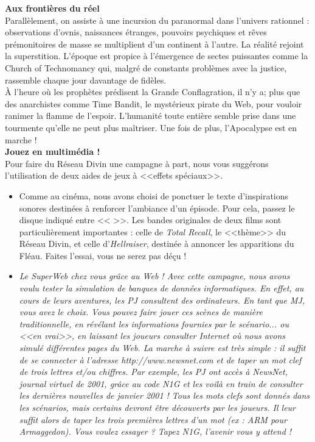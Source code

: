 \documentclass[11pt,twoside,a4paper]{book}
\begin{document}
\textbf{\large Aux fronti{\`e}res du r{\'e}el} ~\\

Parall{\`e}lement, on assiste {\`a} une incursion du paranormal dans l'univers rationnel : observations d'ovnis, naissances {\'e}tranges, pouvoirs psychiques et r{\^e}ves pr{\'e}monitoires de masse se multiplient d'un continent {\`a} l'autre. La r{\'e}alit{\'e} rejoint la superstition. L'{\'e}poque est propice {\`a} l'{\'e}mergence de sectes puissantes comme la Church of Technomancy qui, malgr{\'e} de constants probl{\`e}mes avec la justice, rassemble chaque jour davantage de fid{\`e}les. ~\\

{\`A} l'heure o{\`u} les proph{\`e}tes pr{\'e}disent la Grande Conflagration, il n'y a; plus que des anarchistes comme Time Bandit, le myst{\'e}rieux pirate du Web, pour vouloir ranimer la flamme de l'espoir. L'humanit{\'e} toute enti{\`e}re semble prise dans une tourmente qu'elle ne peut plus ma{\^i}triser. Une fois de plus, l'Apocalypse est en marche ! ~\\

\textbf{\LARGE Jouez en multim{\'e}dia !} ~\\

Pour faire du R{\'e}seau Divin une campagne {\`a} part, nous vous sugg{\'e}rons l'utilisation de deux aides de jeux {\`a} <<effets sp{\'e}ciaux>>.
\begin{itemize}
	\item Comme au cin{\'e}ma, nous avons choisi de ponctuer le texte d'inspirations sonores destin{\'e}es {\`a} renforcer l'ambiance d'un {\'e}pisode. Pour cela, passez le disque indiqu{\'e} entre << >>. Les bandes originales de deux films sont particuli{\`e}rement importantes : celle de \emph{Total Recall}, le <<th{\`e}me>> du R{\'e}seau Divin, et celle d'\emph{Hellraiser}, destin{\'e}e {\`a} annoncer les apparitions du Fl{\'e}au. Faites l'essai, vous ne serez pas d{\'e}\c{c}u ! %
	\item \emph{Le SuperWeb chez vous gr{\^a}ce au Web ! Avec cette campagne, nous avons voulu tester la simulation de banques de donn{\'e}es informatiques. En effet, au cours de leurs aventures, les PJ consultent des ordinateurs. En tant que MJ, vous avez le choix. Vous pouvez faire jouer ces sc{\`e}nes de mani{\`e}re traditionnelle, en r{\'e}v{\'e}lant les informations fournies par le sc{\'e}nario... ou <<en vrai>>, en laissant les joueurs consulter Internet o{\`u} nous avons simul{\'e} diff{\'e}rentes pages du Web. La marche {\`a} suivre est tr{\`e}s simple : il suffit de se connecter {\`a} l'adresse http://www.newsnet.com et de taper un mot clef de trois lettres et/ou chiffres. Par exemple, les PJ ont acc{\`e}s {\`a} NewsNet, journal virtuel de 2001, gr{\^a}ce au code N1G et les voil{\`a} en train de consulter les derni{\`e}res nouvelles de janvier 2001 ! Tous les mots clefs sont donn{\'e}s dans les sc{\'e}narios, mais certains devront {\^e}tre d{\'e}couverts par les joueurs. Il leur suffit alors de taper les trois premi{\`e}res lettres d'un mot (ex : ARM pour Armaggedon). Vous voulez essayer ? Tapez N1G, l'avenir vous y attend !}~\\
\end{itemize}
\end{document}

